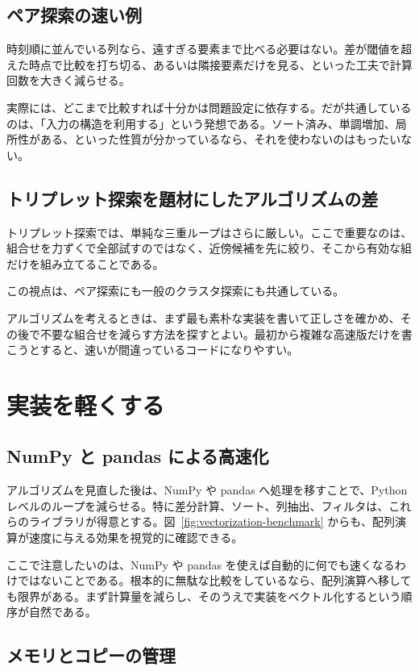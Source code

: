\subsection{ペア探索の速い例}

時刻順に並んでいる列なら、遠すぎる要素まで比べる必要はない。差が閾値を超えた時点で比較を打ち切る、あるいは隣接要素だけを見る、といった工夫で計算回数を大きく減らせる。

実際には、どこまで比較すれば十分かは問題設定に依存する。だが共通しているのは、「入力の構造を利用する」という発想である。ソート済み、単調増加、局所性がある、といった性質が分かっているなら、それを使わないのはもったいない。

\subsection{トリプレット探索を題材にしたアルゴリズムの差}

トリプレット探索では、単純な三重ループはさらに厳しい。ここで重要なのは、組合せを力ずくで全部試すのではなく、近傍候補を先に絞り、そこから有効な組だけを組み立てることである。

この視点は、ペア探索にも一般のクラスタ探索にも共通している。

アルゴリズムを考えるときは、まず最も素朴な実装を書いて正しさを確かめ、その後で不要な組合せを減らす方法を探すとよい。最初から複雑な高速版だけを書こうとすると、速いが間違っているコードになりやすい。

\section{実装を軽くする}

\subsection{NumPy と pandas による高速化}

アルゴリズムを見直した後は、NumPy や pandas へ処理を移すことで、Python レベルのループを減らせる。特に差分計算、ソート、列抽出、フィルタは、これらのライブラリが得意とする。図~\ref{fig:vectorization-benchmark} からも、配列演算が速度に与える効果を視覚的に確認できる。

ここで注意したいのは、NumPy や pandas を使えば自動的に何でも速くなるわけではないことである。根本的に無駄な比較をしているなら、配列演算へ移しても限界がある。まず計算量を減らし、そのうえで実装をベクトル化するという順序が自然である。

\subsection{メモリとコピーの管理}


